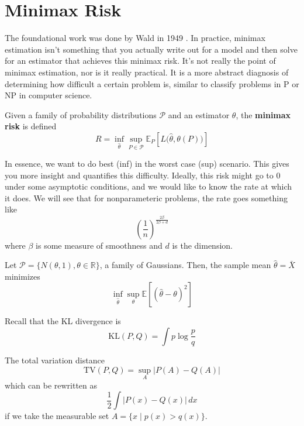 \section{Minimax Risk}

  The foundational work was done by Wald in 1949 \cite{1949wald}. In practice, minimax estimation isn't something that you actually write out for a model and then solve for an estimator that achieves this minimax risk. It's not really the point of minimax estimation, nor is it really practical. It is a more abstract diagnosis of determining how difficult a certain problem is, similar to classify problems in P or NP in computer science. 

  \begin{definition}
    Given a family of probability distributions $\mathscr{P}$ and an estimator $\theta$, the \textbf{minimax risk} is defined 
    \begin{equation}
      R = \inf_{\hat{\theta}} \sup_{P \in \mathscr{P}} \mathbb{E}_P \left[ L \big( \hat{\theta}, \theta(P) \big)\right] 
    \end{equation}
  \end{definition}

  In essence, we want to do best (inf) in the worst case (sup) scenario. This gives you more insight and quantifies this difficulty. Ideally, this risk might go to $0$ under some asymptotic conditions, and we would like to know the rate at which it does. We will see that for nonparameteric problems, the rate goes something like 
  \begin{equation}
    \left( \frac{1}{n} \right)^{\frac{2 \beta}{2 \beta + d}}
  \end{equation}
  where $\beta$ is some measure of smoothness and $d$ is the dimension. 

  \begin{example}[Gaussian]
    Let $\mathscr{P} = \{N(\theta, 1), \theta \in \mathbb{R}\}$, a family of Gaussians. Then, the sample mean $\hat{\theta} = \bar{X}$ minimizes 
    \begin{equation}
      \inf_{\hat{\theta}} \sup_{\theta} \mathbb{E}[ (\hat{\theta} - \theta)^2 ] 
    \end{equation}
  \end{example}

  \begin{definition}
    Recall that the KL divergence is 
    \begin{equation}
      \mathrm{KL}(P, Q) = \int p \log \frac{p}{q} 
    \end{equation}
  \end{definition}

  \begin{definition}
    The total variation distance
    \begin{equation}
      \mathrm{TV}(P, Q) = \sup_{A} | P(A) - Q(A) | 
    \end{equation}
    which can be rewritten as 
    \begin{equation}
      \frac{1}{2} \int |P(x) - Q(x)| \,dx
    \end{equation}
    if we take the measurable set $A = \{x \mid p(x) > q(x) \}$. 
  \end{definition}
